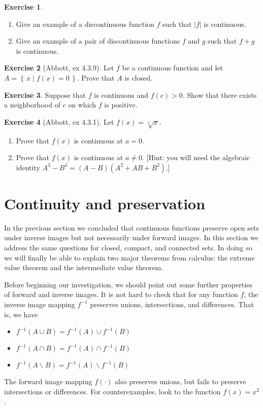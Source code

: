\documentclass[11pt,oneside]{amsbook}
\newcommand{\set}[1]{\left\{\,#1\,\right\}}
\renewcommand{\setminus}{\smallsetminus}
\theoremstyle{definition}
\newtheorem{exerc}{Exercise}[section]
\theoremstyle{plain}
\theoremstyle{definition}
\theoremstyle{remark}
\numberwithin{equation}{section}
\numberwithin{figure}{section}
\begin{document}
\begin{exerc}
  \begin{enumerate}
    \item Give an example of a discontinuous function $f$ such that $|f|$ is continuous.
    \item Give an example of a pair of discontinuous functions $f$ and $g$ such that $f+g$ is continuous.
  \end{enumerate}
\end{exerc}
  
\begin{exerc}[Abbott, ex 4.3.9]
  Let $f$ be a continuous function and let $A=\set{x\mid f(x)=0}$. Prove that $A$ is closed.
\end{exerc}

\begin{exerc}
  Suppose that $f$ is continuous and $f(c)>0$. Show that there exists a neighborhood of $c$ on which $f$ is positive.
\end{exerc}

\begin{exerc}[Abbott, ex 4.3.1]
  Let $f(x)=\sqrt[3]{x}$.
  \begin{enumerate}
    \item Prove that $f(x)$ is continuous at $a=0$.
    \item Prove that $f(x)$ is continuous at $a\neq0$. [Hint: you will need the algebraic identity $A^3-B^3=(A-B)(A^2+AB+B^2)$.]
  \end{enumerate}
\end{exerc}

\newpage
\section{Continuity and preservation}

In the previous section we concluded that continuous functions preserve open sets under inverse images but not necessarily under forward images. In this section we address the same questions for closed, compact, and connected sets. In doing so we will finally be able to explain two major theorems from calculus: the extreme value theorem and the intermediate value theorem.

Before beginning our investigation, we should point out some further properties of forward and inverse images. It is not hard to check that for any function $f$, the inverse image mapping $f^{-1}$ preserves unions, intersections, and differences. That is, we have
\begin{itemize}
\item $f^{-1}(A\cup B)=f^{-1}(A)\cup f^{-1}(B)$
\item $f^{-1}(A\cap B)=f^{-1}(A)\cap f^{-1}(B)$
\item $f^{-1}(A\setminus B)=f^{-1}(A)\setminus f^{-1}(B)$
\end{itemize}
The forward image mapping $f(\cdot)$ also preserves unions, but fails to preserve intersections or differences. For counterexamples, look to the function $f(x)=x^2$.
\end{document}
